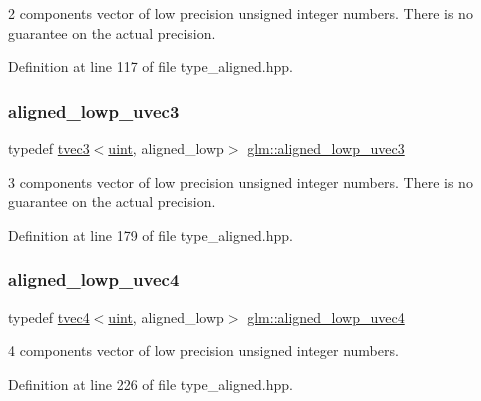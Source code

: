 2 components vector of low precision unsigned integer numbers. There is no guarantee on the actual precision. 

Definition at line 117 of file type\+\_\+aligned.\+hpp.

\mbox{\label{group__gtc__type__aligned_ga3d3b253d6dc1d1ac3b1732f65fd83901}} 
\subsubsection{\texorpdfstring{aligned\_lowp\_uvec3}{aligned\_lowp\_uvec3}}
{\footnotesize\ttfamily typedef \mbox{\hyperlink{structglm_1_1tvec3}{tvec3}}$<$\mbox{\hyperlink{group__core__precision_ga4fd29415871152bfb5abd588334147c8}{uint}}, aligned\+\_\+lowp$>$ \mbox{\hyperlink{group__gtc__type__aligned_ga3d3b253d6dc1d1ac3b1732f65fd83901}{glm\+::aligned\+\_\+lowp\+\_\+uvec3}}}

3 components vector of low precision unsigned integer numbers. There is no guarantee on the actual precision. 

Definition at line 179 of file type\+\_\+aligned.\+hpp.

\mbox{\label{group__gtc__type__aligned_gaddd52f9fd4fe29220ad183043a7d1ddd}} 
\subsubsection{\texorpdfstring{aligned\_lowp\_uvec4}{aligned\_lowp\_uvec4}}
{\footnotesize\ttfamily typedef \mbox{\hyperlink{structglm_1_1tvec4}{tvec4}}$<$\mbox{\hyperlink{group__core__precision_ga4fd29415871152bfb5abd588334147c8}{uint}}, aligned\+\_\+lowp$>$ \mbox{\hyperlink{group__gtc__type__aligned_gaddd52f9fd4fe29220ad183043a7d1ddd}{glm\+::aligned\+\_\+lowp\+\_\+uvec4}}}



4 components vector of low precision unsigned integer numbers. 



Definition at line 226 of file type\+\_\+aligned.\+hpp.

